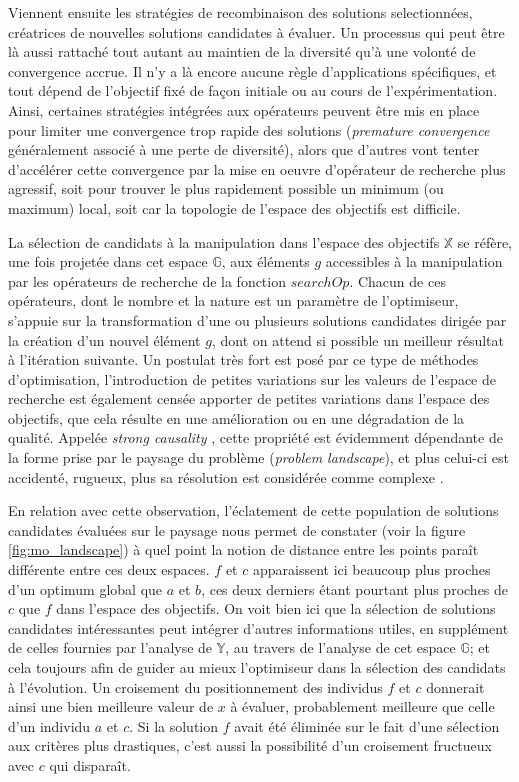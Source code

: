 Viennent ensuite les stratégies de recombinaison des solutions selectionnées, créatrices de nouvelles solutions candidates à évaluer. Un processus qui peut être là aussi rattaché tout autant au maintien de la diversité qu'à une volonté de convergence accrue. Il n'y a là encore aucune règle d'applications spécifiques, et tout dépend de l'objectif fixé de façon initiale ou au cours de l'expérimentation. Ainsi, certaines stratégies intégrées aux opérateurs peuvent être mis en place pour limiter une convergence trop rapide des solutions (\textit{premature convergence} généralement associé à une perte de diversité), alors que d'autres vont tenter d'accélérer cette convergence par la mise en oeuvre d'opérateur de recherche plus agressif, soit pour trouver le plus rapidement possible un minimum (ou maximum) local, soit car la topologie de l'espace des objectifs est difficile.

La sélection de candidats à la manipulation dans l'espace des objectifs $\mathbb{X}$ se réfère, une fois projetée dans cet espace $\mathbb{G}$, aux éléments $g$ accessibles à la manipulation par les opérateurs de recherche de la fonction $searchOp$. Chacun de ces opérateurs, dont le nombre et la nature est un paramètre de l'optimiseur, s'appuie sur la transformation d'une ou plusieurs solutions candidates dirigée par la création d'un nouvel élément $g$, dont on attend si possible un meilleur résultat à l'itération suivante. Un postulat très fort est posé par ce type de méthodes d'optimisation, l'introduction de petites variations sur les valeurs de l'espace de recherche est également censée apporter de petites variations dans l'espace des objectifs, que cela résulte en une amélioration ou en une dégradation de la qualité. Appelée \textit{strong causality} , cette propriété est évidemment dépendante de la forme prise par le paysage du problème (\textit{problem landscape}), et plus celui-ci est accidenté, rugueux, plus sa résolution est considérée comme complexe .

En relation avec cette observation, l'éclatement de cette population de solutions candidates évaluées sur le paysage nous permet de constater (voir la figure \ref{fig:mo_landscape}) à quel point la notion de distance entre les points paraît différente entre ces deux espaces. $f$ et $c$ apparaissent ici beaucoup plus proches d'un optimum global que $a$ et $b$, ces deux derniers étant pourtant plus proches de $c$ que $f$ dans l'espace des objectifs. On voit bien ici que la sélection de solutions candidates intéressantes peut intégrer d'autres informations utiles, en supplément de celles fournies par l'analyse de $\mathbb{Y}$, au travers de l'analyse de cet espace $\mathbb{G}$; et cela toujours afin de guider au mieux l'optimiseur dans la sélection des candidats à l'évolution. Un croisement du positionnement des individus $f$ et $c$ donnerait ainsi une bien meilleure valeur de $x$ à évaluer, probablement meilleure que celle d'un individu $a$ et $c$. Si la solution $f$ avait été éliminée sur le fait d'une sélection aux critères plus drastiques, c'est aussi la possibilité d'un croisement fructueux avec $c$ qui disparaît.


